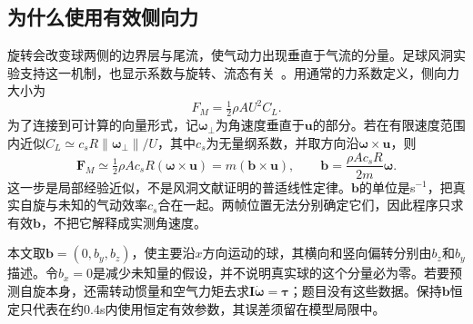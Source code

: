 \documentclass[11pt,a4paper,UTF8,fontset=windows]{ctexart}
\begin{document}
\subsection{为什么使用有效侧向力}
旋转会改变球两侧的边界层与尾流，使气动力出现垂直于气流的分量。足球风洞实验支持这一机制，也显示系数与旋转、流态有关~\cite{asai}。用通常的力系数定义，侧向力大小为
\begin{equation}
F_M=\tfrac12\rho AU^2C_L.
\end{equation}
为了连接到可计算的向量形式，记$\boldsymbol\omega_\perp$为角速度垂直于$\mathbf u$的部分。若在有限速度范围内近似$C_L\simeq c_sR\|\boldsymbol\omega_\perp\|/U$，其中$c_s$为无量纲系数，并取方向沿$\boldsymbol\omega\times\mathbf u$，则
\begin{equation}
\mathbf F_M\simeq\tfrac12\rho Ac_sR(\boldsymbol\omega\times\mathbf u)
=m(\mathbf b\times\mathbf u),\qquad
\mathbf b=\frac{\rho Ac_sR}{2m}\boldsymbol\omega.
\label{eq:magnus}
\end{equation}
这一步是局部经验近似，不是风洞文献证明的普适线性定律。$\mathbf b$的单位是s$^{-1}$，把真实自旋与未知的气动效率$c_s$合在一起。两帧位置无法分别确定它们，因此程序只求有效$\mathbf b$，不把它解释成实测角速度。

本文取$\mathbf b=(0,b_y,b_z)$，使主要沿$x$方向运动的球，其横向和竖向偏转分别由$b_z$和$b_y$描述。令$b_x=0$是减少未知量的假设，并不说明真实球的这个分量必为零。若要预测自旋本身，还需转动惯量和空气力矩去求$\mathbf I\dot{\boldsymbol\omega}=\boldsymbol\tau$；题目没有这些数据。保持$\mathbf b$恒定只代表在约0.4s内使用恒定有效参数，其误差须留在模型局限中。
\end{document}
